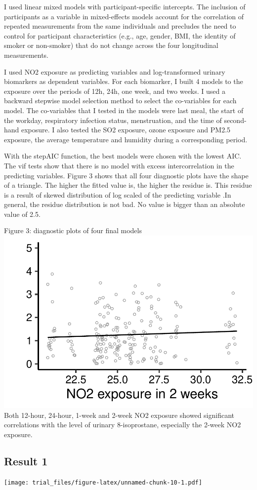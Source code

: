 \documentclass[12pt,]{article}
\begin{document}
I used linear mixed models with participant-specific intercepts. The
inclusion of participants as a variable in mixed-effects models account
for the correlation of repeated measurements from the same individuals
and precludes the need to control for participant characteristics (e.g.,
age, gender, BMI, the identity of smoker or non-smoker) that do not
change across the four longitudinal measurements.

I used NO2 exposure as predicting variables and log-transformed urinary
biomarkers as dependent variables. For each biomarker, I built 4 models
to the exposure over the periods of 12h, 24h, one week, and two weeks. I
used a backward stepwise model selection method to select the
co-variables for each model. The co-variables that I tested in the
models were last meal, the start of the workday, respiratory infection
status, menstruation, and the time of second-hand exposure. I also
tested the SO2 exposure, ozone exposure and PM2.5 exposure, the average
temperature and humidity during a corresponding period.

With the stepAIC function, the best models were chosen with the lowest
AIC. The vif tests show that there is no model with excess
intercorrelation in the predicting variables. Figure 3 shows that all
four diagnostic plots have the shape of a triangle. The higher the
fitted value is, the higher the residue is. This residue is a result of
skewed distribution of log scaled of the predicting variable .In
general, the residue distribution is not bad. No value is bigger than an
absolute value of 2.5.

Figure 3: diagnostic plots of four final models
\includegraphics{trial_files/figure-latex/unnamed-chunk-9-1.pdf} Both
12-hour, 24-hour, 1-week and 2-week NO2 exposure showed significant
correlations with the level of urinary 8-isoprostane, especially the
2-week NO2 exposure.

\hypertarget{result-1}{%
\subsection{Result 1}\label{result-1}}

\texttt{[image: trial\_files/figure-latex/unnamed-chunk-10-1.pdf]}
\end{document}
